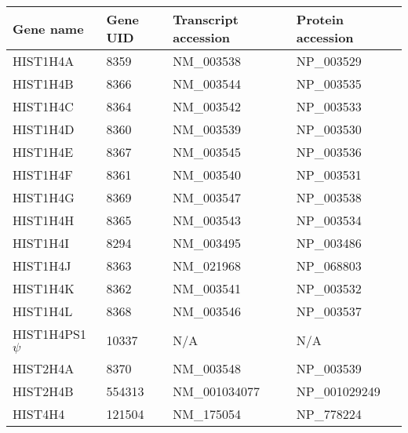 \begin{tabular}{l | l | l | l }
  Gene name & Gene UID & Transcript accession & Protein accession \\
  \hline
   HIST1H4A & 8359 & NM\_003538 & NP\_003529 \\
   HIST1H4B & 8366 & NM\_003544 & NP\_003535 \\
   HIST1H4C & 8364 & NM\_003542 & NP\_003533 \\
   HIST1H4D & 8360 & NM\_003539 & NP\_003530 \\
   HIST1H4E & 8367 & NM\_003545 & NP\_003536 \\
   HIST1H4F & 8361 & NM\_003540 & NP\_003531 \\
   HIST1H4G & 8369 & NM\_003547 & NP\_003538 \\
   HIST1H4H & 8365 & NM\_003543 & NP\_003534 \\
   HIST1H4I & 8294 & NM\_003495 & NP\_003486 \\
   HIST1H4J & 8363 & NM\_021968 & NP\_068803 \\
   HIST1H4K & 8362 & NM\_003541 & NP\_003532 \\
   HIST1H4L & 8368 & NM\_003546 & NP\_003537 \\
   HIST1H4PS1 $\psi$ & 10337 & N/A & N/A \\
   HIST2H4A & 8370 & NM\_003548 & NP\_003539 \\
   HIST2H4B & 554313 & NM\_001034077 & NP\_001029249 \\
   HIST4H4 & 121504 & NM\_175054 & NP\_778224 \\
\end{tabular}
